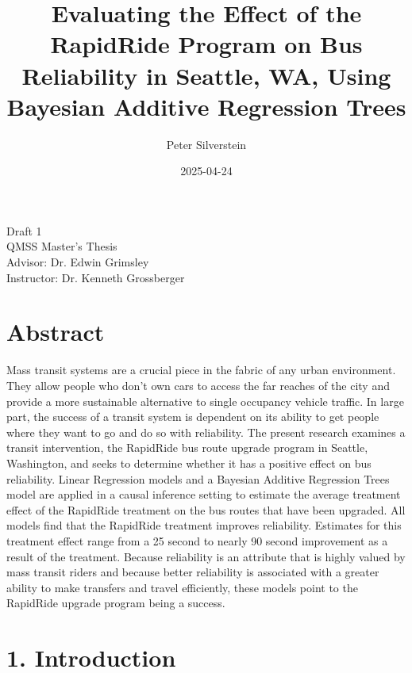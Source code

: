 \documentclass[
  12pt,
]{article}
\title{Evaluating the Effect of the RapidRide Program on Bus Reliability
in Seattle, WA, Using Bayesian Additive Regression Trees}
\author{Peter Silverstein}
\date{2025-04-24}
\begin{document}
\maketitle

\begin{center}
    {\large Draft 1}\\[0.5cm]
    {\large QMSS Master's Thesis}\\[0.5cm]
    {\large Advisor: Dr. Edwin Grimsley}\\[0.5cm]
    {\large Instructor: Dr. Kenneth Grossberger}\\[0.5cm]
\end{center}

\newpage

\tableofcontents

\newpage

\section{Abstract}\label{abstract}

Mass transit systems are a crucial piece in the fabric of any urban
environment. They allow people who don't own cars to access the far
reaches of the city and provide a more sustainable alternative to single
occupancy vehicle traffic. In large part, the success of a transit
system is dependent on its ability to get people where they want to go
and do so with reliability. The present research examines a transit
intervention, the RapidRide bus route upgrade program in Seattle,
Washington, and seeks to determine whether it has a positive effect on
bus reliability. Linear Regression models and a Bayesian Additive
Regression Trees model are applied in a causal inference setting to
estimate the average treatment effect of the RapidRide treatment on the
bus routes that have been upgraded. All models find that the RapidRide
treatment improves reliability. Estimates for this treatment effect
range from a 25 second to nearly 90 second improvement as a result of
the treatment. Because reliability is an attribute that is highly valued
by mass transit riders and because better reliability is associated with
a greater ability to make transfers and travel efficiently, these models
point to the RapidRide upgrade program being a success.

\newpage

\section{1. Introduction}\label{introduction}
\end{document}
